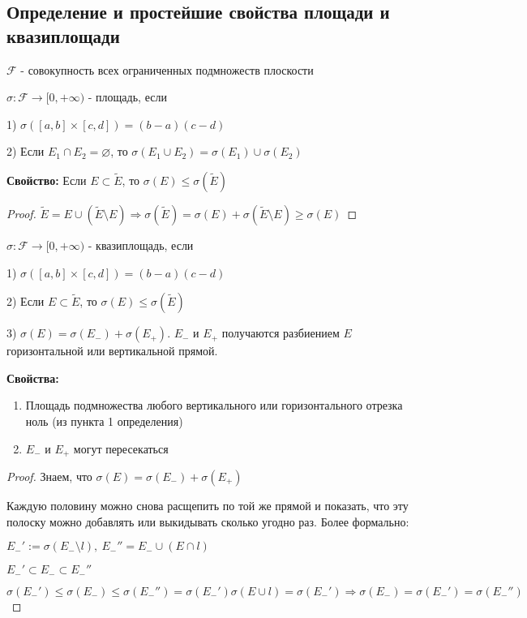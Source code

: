 \subsection{Определение и простейшие свойства площади и квазиплощади \href{https://youtu.be/p9C57KDo1Yg?t=6438}{\Walley}}

$\mathcal{F}$ - совокупность всех ограниченных подмножеств плоскости

\begin{conj}
    $\sigma: \mathcal{F} \to [0, +\infty)$ - площадь, если

    1) $\sigma([a, b]\times[c, d]) = (b-a)(c-d)$

    2) Если $E_1\cap E_2 = \varnothing$, то $\sigma(E_1 \cup E_2) = \sigma(E_1) \cup \sigma(E_2)$
\end{conj}

\textbf{Свойство:} Если $E \subset \widetilde{E}$, то
$\sigma(E) \leqslant \sigma(\widetilde{E})$

\begin{proof}
    $\widetilde{E} = E \cup (\widetilde{E} \setminus E) \Rightarrow
    \sigma(\widetilde{E}) = \sigma(E) + \sigma(\widetilde{E} \setminus E) \geqslant \sigma(E)$
\end{proof}

\begin{conj}
    $\sigma: \mathcal{F} \to [0, +\infty)$ - квазиплощадь, если

    1) $\sigma([a, b]\times[c, d]) = (b-a)(c-d)$

    2) Если $E \subset \widetilde{E}$, то $\sigma(E) \leqslant \sigma(\widetilde{E})$

    3) $\sigma(E) = \sigma(E_{-}) + \sigma(E_{+})$. $E_{-}$ и $E_{+}$ получаются
    разбиением $E$ горизонтальной или вертикальной прямой.
\end{conj}

\textbf{Свойства:}
\begin{enumerate}
    \item Площадь подмножества любого вертикального или горизонтального отрезка ноль (из пункта 1 определения)
    \item $E_{-}$ и $E_{+}$ могут пересекаться 
\end{enumerate}

\begin{proof}
    Знаем, что $\sigma(E) = \sigma(E_-) + \sigma(E_+)$

    Каждую половину можно снова расщепить по той же прямой и показать, что эту полоску 
    можно добавлять или выкидывать сколько угодно раз.
    Более формально:

    $E_-' := \sigma(E_- \setminus l),\ 
    E_-'' = E_- \cup (E \cap l)$

    $E_-' \subset E_- \subset E_-''$

    \[\sigma(E_-') \leqslant \sigma(E_-) \leqslant \sigma(E_-'') = \sigma(E_-') \sigma(E \cup l) = \sigma(E_-') \Rightarrow
    \sigma(E_-) = \sigma(E_-') = \sigma(E_-'')\]
\end{proof}
